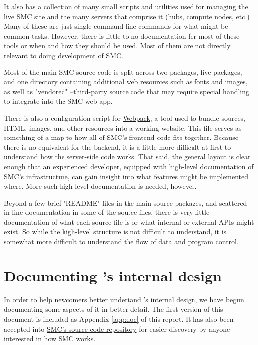 \documentclass{deliverablereport}
\begin{document}
It also has a collection of many small scripts and utilities used for managing
the live SMC site and the many servers that comprise it (hubs, compute nodes,
etc.)  Many of these are just single command-line commands for what might be
common tasks.  However, there is little to no documentation for most of these
tools or when and how they should be used.  Most of them are not directly
relevant to doing development of SMC.

Most of the main SMC source code is split across two \Python packages, five
\JavaScript packages, and one directory containing additional web resources
such as fonts and images, as well as "vendored" \JavaScript--third-party source
code that may require special handling to integrate into the SMC web app.

There is also a configuration script for
\href{https://webpack.github.io/}{Webpack}, a tool used to bundle \JavaScript
sources, HTML, images, and other resources into a working website.  This file
serves as something of a map to how all of SMC's frontend code fits together.
Because there is no equivalent for the backend, it is a little more difficult
at first to understand how the server-side code works.  That said, the general
layout is clear enough that an experienced developer, equipped with high-level
documentation of SMC's infrastructure, can gain insight into what features
might be implemented where.  More such high-level documentation is needed,
however.

Beyond a few brief "README" files in the main source packages, and scattered
in-line documentation in some of the source files, there is very little
documentation of what each source file is or what internal or external APIs
might exist.  So while the high-level structure is not difficult to understand,
it is somewhat more difficult to understand the flow of data and program
control.

\section{Documenting \SMC's internal design}

In order to help newcomers better undertand \SMC's internal design, we have
begun documenting some aspects of it in better detail.  The first version of
this document is included as Appendix \ref{app:doc} of this report. It has also
been accepted into
\href{https://github.com/sagemathinc/smc/blob/master/src/doc/design_overview/overview.rst}{SMC's
source code repository} for easier discovery by anyone interested in how SMC
works.
\end{document}
